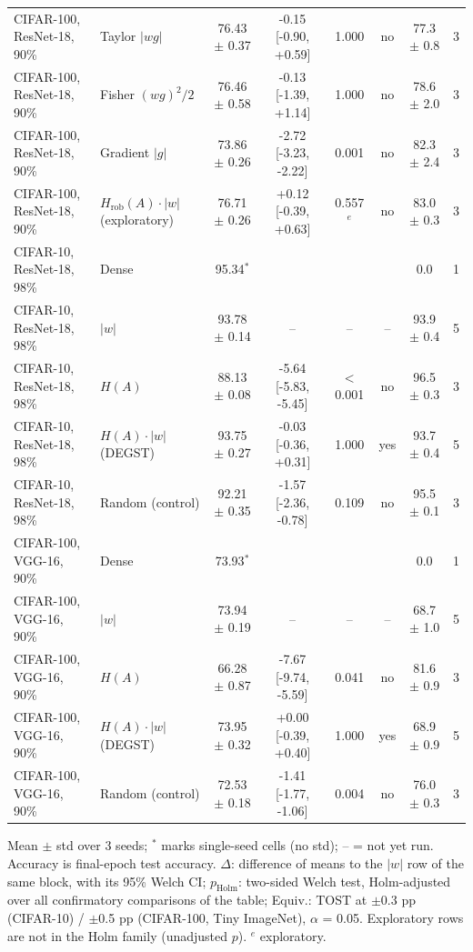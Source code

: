 \begin{table}[t]
{\begin{tabular}{llcccccc}
CIFAR-100, ResNet-18, 90\% & Taylor $|wg|$ & 76.43 $\pm$ 0.37 & -0.15 [-0.90, +0.59] & 1.000 & no & 77.3 $\pm$ 0.8 & 3 \\
CIFAR-100, ResNet-18, 90\% & Fisher $(wg)^2/2$ & 76.46 $\pm$ 0.58 & -0.13 [-1.39, +1.14] & 1.000 & no & 78.6 $\pm$ 2.0 & 3 \\
CIFAR-100, ResNet-18, 90\% & Gradient $|g|$ & 73.86 $\pm$ 0.26 & -2.72 [-3.23, -2.22] & 0.001 & no & 82.3 $\pm$ 2.4 & 3 \\
CIFAR-100, ResNet-18, 90\% & $H_{\mathrm{rob}}(A)\cdot|w|$ (exploratory) & 76.71 $\pm$ 0.26 & +0.12 [-0.39, +0.63] & 0.557$^{e}$ & no & 83.0 $\pm$ 0.3 & 3 \\
CIFAR-10, ResNet-18, 98\% & Dense & 95.34$^{*}$ &  &  &  & 0.0 & 1 \\
CIFAR-10, ResNet-18, 98\% & $|w|$ & 93.78 $\pm$ 0.14 & -- & -- & -- & 93.9 $\pm$ 0.4 & 5 \\
CIFAR-10, ResNet-18, 98\% & $H(A)$ & 88.13 $\pm$ 0.08 & -5.64 [-5.83, -5.45] & $<$0.001 & no & 96.5 $\pm$ 0.3 & 3 \\
CIFAR-10, ResNet-18, 98\% & $H(A)\cdot|w|$ (DEGST) & 93.75 $\pm$ 0.27 & -0.03 [-0.36, +0.31] & 1.000 & yes & 93.7 $\pm$ 0.4 & 5 \\
CIFAR-10, ResNet-18, 98\% & Random (control) & 92.21 $\pm$ 0.35 & -1.57 [-2.36, -0.78] & 0.109 & no & 95.5 $\pm$ 0.1 & 3 \\
CIFAR-100, VGG-16, 90\% & Dense & 73.93$^{*}$ &  &  &  & 0.0 & 1 \\
CIFAR-100, VGG-16, 90\% & $|w|$ & 73.94 $\pm$ 0.19 & -- & -- & -- & 68.7 $\pm$ 1.0 & 5 \\
CIFAR-100, VGG-16, 90\% & $H(A)$ & 66.28 $\pm$ 0.87 & -7.67 [-9.74, -5.59] & 0.041 & no & 81.6 $\pm$ 0.9 & 3 \\
CIFAR-100, VGG-16, 90\% & $H(A)\cdot|w|$ (DEGST) & 73.95 $\pm$ 0.32 & +0.00 [-0.39, +0.40] & 1.000 & yes & 68.9 $\pm$ 0.9 & 5 \\
CIFAR-100, VGG-16, 90\% & Random (control) & 72.53 $\pm$ 0.18 & -1.41 [-1.77, -1.06] & 0.004 & no & 76.0 $\pm$ 0.3 & 3 \\
\bottomrule
\end{tabular}}
\par\smallskip\footnotesize Mean $\pm$ std over 3 seeds; $^{*}$ marks single-seed cells (no std); -- = not yet run. Accuracy is final-epoch test accuracy. $\Delta$: difference of means to the $|w|$ row of the same block, with its 95\% Welch CI; $p_{\mathrm{Holm}}$: two-sided Welch test, Holm-adjusted over all confirmatory comparisons of the table; Equiv.: TOST at $\pm$0.3 pp (CIFAR-10) / $\pm$0.5 pp (CIFAR-100, Tiny ImageNet), $\alpha$ = 0.05. Exploratory rows are not in the Holm family (unadjusted $p$). $^{e}$ exploratory.
\end{table}
